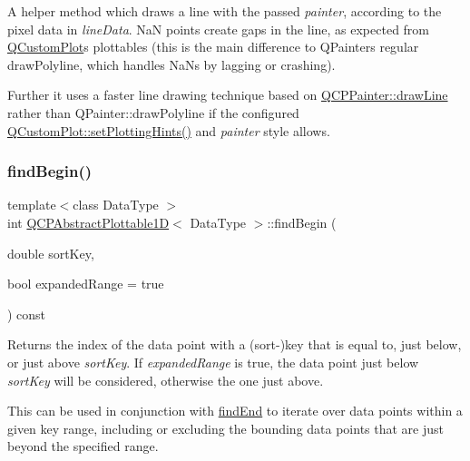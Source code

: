A helper method which draws a line with the passed {\itshape painter}, according to the pixel data in {\itshape line\+Data}. NaN points create gaps in the line, as expected from \mbox{\hyperlink{class_q_custom_plot}{Q\+Custom\+Plot}}\textquotesingle{}s plottables (this is the main difference to Q\+Painter\textquotesingle{}s regular draw\+Polyline, which handles Na\+Ns by lagging or crashing).

Further it uses a faster line drawing technique based on \mbox{\hyperlink{class_q_c_p_painter_a0b4b1b9bd495e182c731774dc800e6e0}{Q\+C\+P\+Painter\+::draw\+Line}} rather than {\ttfamily Q\+Painter\+::draw\+Polyline} if the configured \mbox{\hyperlink{class_q_custom_plot_a94a33cbdadbbac5934843508bcfc210d}{Q\+Custom\+Plot\+::set\+Plotting\+Hints()}} and {\itshape painter} style allows. \mbox{\label{class_q_c_p_abstract_plottable1_d_ae6ead74a0d6a17954e1857f361b9ccf2}} 
\subsubsection{\texorpdfstring{find\+Begin()}{findBegin()}}
{\footnotesize\ttfamily template$<$class Data\+Type $>$ \\
int \mbox{\hyperlink{class_q_c_p_abstract_plottable1_d}{Q\+C\+P\+Abstract\+Plottable1D}}$<$ Data\+Type $>$\+::find\+Begin (\begin{DoxyParamCaption}\item[{double}]{sort\+Key,  }\item[{bool}]{expanded\+Range = {\ttfamily true} }\end{DoxyParamCaption}) const\hspace{0.3cm}{\ttfamily [virtual]}}





Returns the index of the data point with a (sort-\/)key that is equal to, just below, or just above {\itshape sort\+Key}. If {\itshape expanded\+Range} is true, the data point just below {\itshape sort\+Key} will be considered, otherwise the one just above.

This can be used in conjunction with \mbox{\hyperlink{class_q_c_p_abstract_plottable1_d_ad913df7f02add35150779dce3913aeae}{find\+End}} to iterate over data points within a given key range, including or excluding the bounding data points that are just beyond the specified range.

